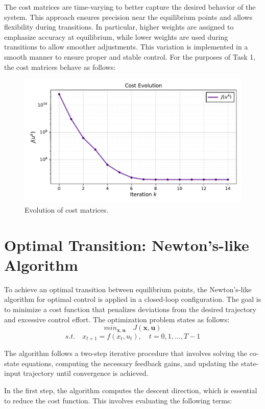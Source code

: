 The cost matrices are time-varying to better capture the desired behavior of the system. This approach ensures precision near the equilibrium points and allows flexibility during transitions. In particular, higher weights are assigned to emphasize accuracy at equilibrium, while lower weights are used during transitions to allow smoother adjustments. This variation is implemented in a smooth manner to ensure proper and stable control. 
For the purposes of Task 1, the cost matrices behave as follows:
\begin{figure}[htb]
    \centering
    \includegraphics[width=0.8\linewidth]{img/1-Task1/cost_evolution.pdf}
    \caption{Evolution of cost matrices.}
    \label{fig:dtheta2-evolution}
\end{figure}



\section{Optimal Transition: Newton's-like Algorithm}
To achieve an optimal transition between equilibrium points, the Newton's-like algorithm for optimal control is applied in a closed-loop configuration. 
The goal is to minimize a cost function that penalizes deviations from the desired trajectory and excessive control effort.
The optimization problem states as follows:
\[min_{\mathbf{x},\mathbf{u}} \quad J(\mathbf{x},\mathbf{u})
\]
\[{s.t. }  \quad x_{t+1} = f(x_t,u_t), \quad t=0,1,...,T-1 
\]

The algorithm follows a two-step iterative procedure that involves solving the co-state equations, computing the necessary feedback gains, and updating the state-input trajectory until convergence is achieved.

In the first step, the algorithm computes the descent direction, which is essential to reduce the cost function. This involves evaluating the following terms:

